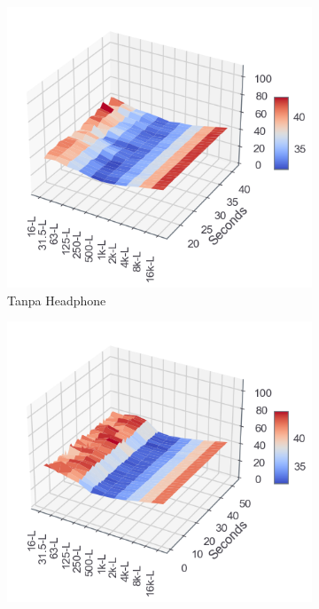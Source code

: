 \documentclass[12pt,]{article}
\begin{document}
\begin{itemize}
		\begin{figure}[!ht]
			\centering
			\begin{subfigure}[b]{0.3\textwidth}
				\includegraphics[width=\textwidth]{images/graph/nounitnohp}
				\caption{Tanpa Headphone}
			\end{subfigure}
			\begin{subfigure}[b]{0.3\textwidth}
				\includegraphics[width=\textwidth]{images/graph/nounitminiso}

\end{subfigure}
\end{figure}
\end{itemize}
\end{document}
